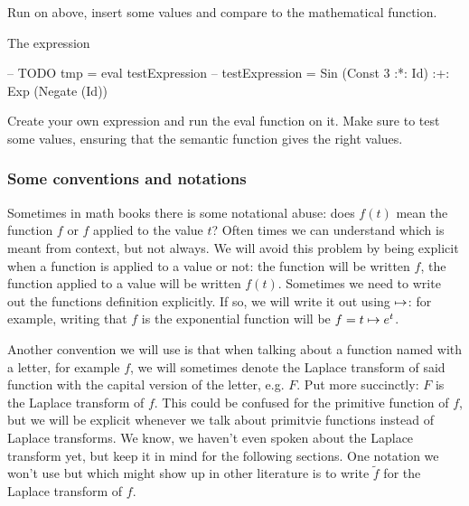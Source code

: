 \begin{example}
  Run  on  above, insert some values and compare
  to the mathematical function. 
\end{example}
\begin{solution}
  The expression
\begin{code}
 -- TODO
tmp = eval testExpression
 -- testExpression = Sin (Const 3 :*: Id) :+: Exp (Negate (Id))
\end{code}
\end{solution}
\begin{exercise}
  Create your own expression and run the eval function on it. Make sure to test
  some values, ensuring that the semantic function gives the right values.
\end{exercise}

\subsubsection{Some conventions and notations}
Sometimes in math books there is some notational abuse: does $f(t)$ mean the
function $f$ or $f$ applied to the value $t$? Often times we can understand
which is meant from context, but not always. We will avoid this problem by being
explicit when a function is applied to a value or not: the function will be written
$f$, the function applied to a value will be written $f(t)$. Sometimes we need
to write out the functions definition explicitly. If so, we will write it out
using $\mapsto$: for example, writing that $f$ is the exponential function will
be $f = t \mapsto e^{t}$.

Another convention we will use is that when talking about a function named with
a letter, for example $f$, we will sometimes denote the Laplace transform of
said function with the capital version of the letter, e.g. $F$. Put more
succinctly: $F$ is the Laplace transform of $f$. This could be confused for the
primitive function of $f$, but we will be explicit whenever we talk about
primitvie functions instead of Laplace transforms. We know, we haven't even spoken
about the Laplace transform yet, but keep it in mind for the following sections.
One notation we won't use but which might show up in other literature
is to write $\tilde{f}$ for the Laplace transform of $f$. 
